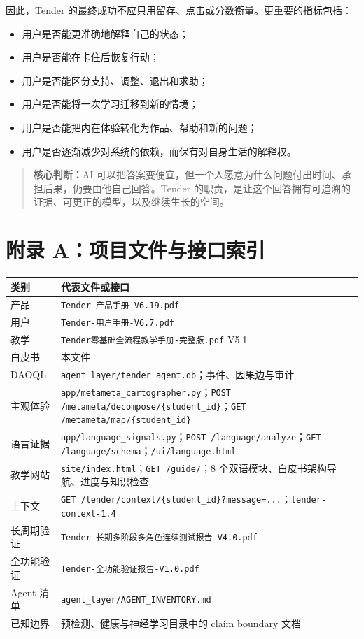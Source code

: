 \documentclass[UTF8,a4paper,11pt]{ctexart}
\newcommand{\keypoint}[1]{\begin{quote}\noindent\textbf{\color{TenderBlue}核心判断：}#1\end{quote}}
\begin{document}
因此，Tender 的最终成功不应只用留存、点击或分数衡量。更重要的指标包括：

\begin{itemize}
\item 用户是否能更准确地解释自己的状态；
\item 用户是否能在卡住后恢复行动；
\item 用户是否能区分支持、调整、退出和求助；
\item 用户是否能将一次学习迁移到新的情境；
\item 用户是否能把内在体验转化为作品、帮助和新的问题；
\item 用户是否逐渐减少对系统的依赖，而保有对自身生活的解释权。
\end{itemize}

\keypoint{AI 可以把答案变便宜，但一个人愿意为什么问题付出时间、承担后果，仍要由他自己回答。Tender 的职责，是让这个回答拥有可追溯的证据、可更正的模型，以及继续生长的空间。}

\newpage
\appendix
\section{附录 A：项目文件与接口索引}

\begin{center}
\begin{longtable}{@{}p{4.2cm}p{8.8cm}@{}}
\toprule
\textbf{类别} & \textbf{代表文件或接口} \\
\midrule
产品 & \texttt{Tender-产品手册-V6.19.pdf} \\
用户 & \texttt{Tender-用户手册-V6.7.pdf} \\
教学 & \texttt{Tender零基础全流程教学手册-完整版.pdf} V5.1 \\
白皮书 & 本文件 \\
DAOQL & \texttt{agent\_layer/tender\_agent.db}；事件、因果边与审计 \\
主观体验 & \texttt{app/metameta\_cartographer.py}；\texttt{POST /metameta/decompose/\{student\_id\}}；\texttt{GET /metameta/map/\{student\_id\}} \\
语言证据 & \texttt{app/language\_signals.py}；\texttt{POST /language/analyze}；\texttt{GET /language/schema}；\texttt{/ui/language.html} \\
教学网站 & \texttt{site/index.html}；\texttt{GET /guide/}；8 个双语模块、白皮书架构导航、进度与知识检查 \\
上下文 & \texttt{GET /tender/context/\{student\_id\}?message=...}；\texttt{tender-context-1.4} \\
长周期验证 & \texttt{Tender-长期多阶段多角色连续测试报告-V4.0.pdf} \\
全功能验证 & \texttt{Tender-全功能验证报告-V1.0.pdf} \\
Agent 清单 & \texttt{agent\_layer/AGENT\_INVENTORY.md} \\
已知边界 & 预检测、健康与神经学习目录中的 claim boundary 文档 \\
\bottomrule
\end{longtable}
\end{center}
\end{document}
